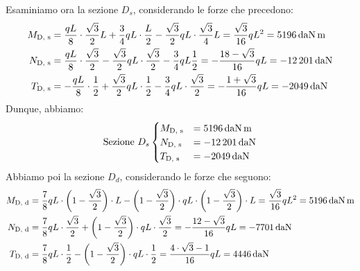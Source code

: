 Esaminiamo ora la sezione $D_s$, considerando le forze che precedono:
\begin{align*}
M_{\textup{D, s}} &= \frac{qL}{8}\cdot \frac{\sqrt{3}}{2}L + \frac{3}{4}qL \cdot \frac{L}{2} - \frac{\sqrt{3}}{2}qL \cdot \frac{\sqrt{3}}{4}L = \frac{\sqrt{3}}{16} qL^{2} = \SI{5196}{daN.m} \\
N_{\textup{D, s}} &= \frac{qL}{8}\cdot \frac{\sqrt{3}}{2} - \frac{\sqrt{3}}{2}qL \cdot \frac{\sqrt{3}}{2} - \frac{3}{4}qL\frac{1}{2} = - \frac{18-\sqrt{3}}{16} qL = - \SI{12201}{daN} \\
T_{\textup{D, s}} &= - \frac{qL}{8} \cdot \frac{1}{2} + \frac{\sqrt{3}}{2}qL\cdot \frac{1}{2} - \frac{3}{4}qL \cdot \frac{\sqrt{3}}{2} = -\frac{1+\sqrt{3}}{16}qL = -\SI{2049}{daN}
\end{align*}
Dunque, abbiamo:
\begin{equation*}
\text{Sezione } D_{s} 
\begin{cases}
M_{\textup{D, s}} &=  \SI{5196}{daN.m} \\
N_{\textup{D, s}} &=  -\SI{12201}{daN} \\
T_{\textup{D, s}} & = -\SI{2049}{daN}
\end{cases}
\end{equation*}
Abbiamo poi la sezione $D_d$, considerando le forze che seguono:
\begin{align*}
M_{\textup{D, d}} &= \frac{7}{8}qL\cdot \biggl( 1 - \frac{\sqrt{3}}{2}\biggr)\cdot L - \biggl(1 - \frac{\sqrt{3}}{2} \biggr) \cdot qL \cdot \biggl(1 - \frac{\sqrt{3}}{2}\biggr) \cdot L = \frac{\sqrt{3}}{16} qL^{2} = \SI{5196}{daN.m} \\
N_{\textup{D, d}} &= \frac{7}{8}qL\cdot \frac{\sqrt{3}}{2} + \biggl(1 - \frac{\sqrt{3}}{2}\biggr)\cdot qL\cdot \frac{\sqrt{3}}{2} = - \frac{12-\sqrt{3}}{16} qL = - \SI{7701}{daN} \\
T_{\textup{D, d}} &=  \frac{7}{8}qL\cdot \frac{1}{2} - \biggl(1 - \frac{\sqrt{3}}{2}\biggr)\cdot qL \cdot \frac{1}{2} = \frac{4\cdot \sqrt{3}-1}{16}qL = \SI{4446}{daN}
\end{align*}
